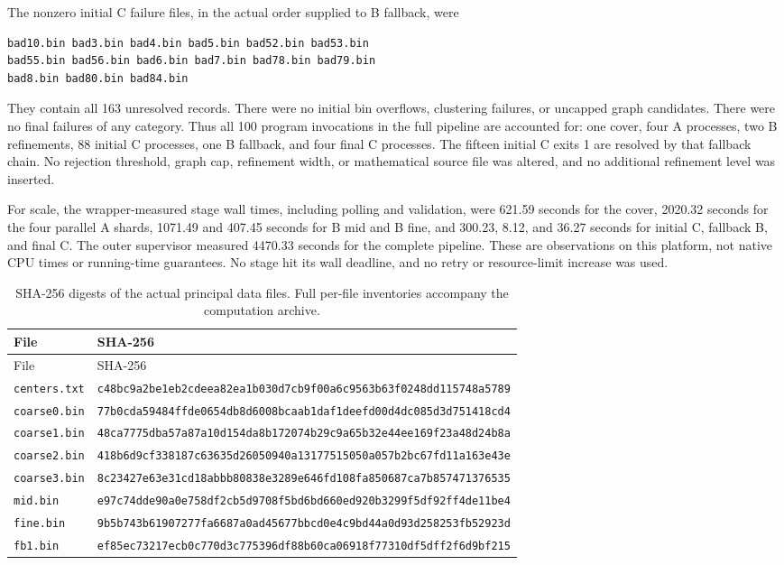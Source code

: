 The nonzero initial C failure files, in the actual order supplied to
B fallback, were
\begin{lstlisting}
bad10.bin bad3.bin bad4.bin bad5.bin bad52.bin bad53.bin
bad55.bin bad56.bin bad6.bin bad7.bin bad78.bin bad79.bin
bad8.bin bad80.bin bad84.bin
\end{lstlisting}
They contain all 163 unresolved records. There were no initial bin
overflows, clustering failures, or uncapped graph candidates. There
were no final failures of any category. Thus all 100 program invocations
in the full pipeline are accounted for: one cover, four A processes,
two B refinements, 88 initial C processes, one B fallback, and four
final C processes. The fifteen initial C exits 1 are resolved by that
fallback chain. No rejection threshold, graph cap, refinement width,
or mathematical source file was altered, and no additional refinement
level was inserted.

For scale, the wrapper-measured stage wall times, including polling and
validation, were 621.59 seconds for the cover, 2020.32 seconds for the
four parallel A shards, 1071.49 and 407.45 seconds for B mid and B fine,
and 300.23, 8.12, and 36.27 seconds for initial C, fallback B, and final C.
The outer supervisor measured 4470.33 seconds for the complete pipeline.
These are observations on this platform, not native CPU times or
running-time guarantees. No stage hit its wall deadline, and no retry
or resource-limit increase was used.

\begin{longtable}{@{}p{}p{}@{}}
\caption{SHA-256 digests of the actual principal data files. Full
per-file inventories accompany the computation archive.}
\label{execute:hashes}\\
\toprule
File & SHA-256\\
\midrule
\endfirsthead
\toprule
File & SHA-256\\
\midrule
\endhead
\texttt{centers.txt} & {\scriptsize\texttt{c48bc9a2be1eb2cdeea82ea1b030d7cb9f00a6c9563b63f0248dd115748a5789}}\\
\texttt{coarse0.bin} & {\scriptsize\texttt{77b0cda59484ffde0654db8d6008bcaab1daf1deefd00d4dc085d3d751418cd4}}\\
\texttt{coarse1.bin} & {\scriptsize\texttt{48ca7775dba57a87a10d154da8b172074b29c9a65b32e44ee169f23a48d24b8a}}\\
\texttt{coarse2.bin} & {\scriptsize\texttt{418b6d9cf338187c63635d26050940a13177515050a057b2bc67fd11a163e43e}}\\
\texttt{coarse3.bin} & {\scriptsize\texttt{8c23427e63e31cd18abbb80838e3289e646fd108fa850687ca7b857471376535}}\\
\texttt{mid.bin} & {\scriptsize\texttt{e97c74dde90a0e758df2cb5d9708f5bd6bd660ed920b3299f5df92ff4de11be4}}\\
\texttt{fine.bin} & {\scriptsize\texttt{9b5b743b61907277fa6687a0ad45677bbcd0e4c9bd44a0d93d258253fb52923d}}\\
\texttt{fb1.bin} & {\scriptsize\texttt{ef85ec73217ecb0c770d3c775396df88b60ca06918f77310df5dff2f6d9bf215}}\\
\bottomrule
\end{longtable}

